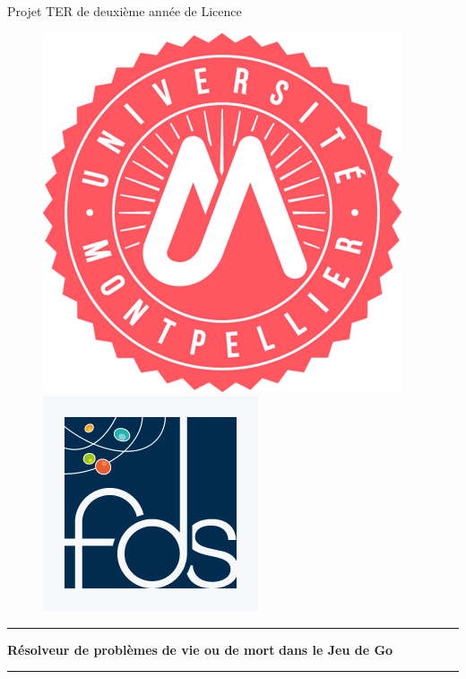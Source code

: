 \begin{titlepage}
    \begin{center}
    
    \newcommand{\HorizontalLine}{\rule{\linewidth}{0.3mm}}
    
    {\Large Projet TER de deuxième année de Licence}\\[1.3cm]
    \begin{figure}[h!]
        \centering
        \includegraphics[scale=1]{figures/experiments/um.png}
        \includegraphics[scale=0.4]{figures/experiments/fds_logo.jpg}
        \label{fig:logos}
    \end{figure}
    
    \HorizontalLine %
    \begin{spacing}{3}
        {\huge \bfseries Résolveur de problèmes}
        {\huge \bfseries de vie ou de mort} 
        {\huge \bfseries dans le Jeu de Go}
    \end{spacing}
    \HorizontalLine \\[1.5cm]
    

\end{center}
\end{titlepage}
